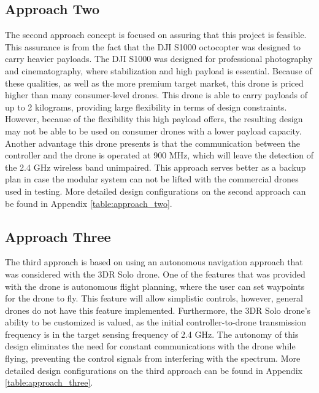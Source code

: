 \subsection{Approach Two}
The second approach concept is focused on assuring that this project is feasible. This assurance is from the fact that the DJI S1000 octocopter was designed to carry heavier payloads. The DJI S1000 was designed for professional photography and cinematography, where stabilization and high payload is essential. Because of these qualities, as well as the more premium target market, this drone is priced higher than many consumer-level drones. This drone is able to carry payloads of up to 2 kilograms, providing large flexibility in terms of design constraints. However, because of the flexibility this high payload offers, the resulting design may not be able to be used on consumer drones with a lower payload capacity. Another advantage this drone presents is that the communication between the controller and the drone is operated at 900 MHz, which will leave the detection of the 2.4 GHz wireless band unimpaired. This approach serves better as a backup plan in case the modular system can not be lifted with the commercial drones used in testing. More detailed design configurations on the second approach can be found in Appendix \ref{table:approach_two}.

\subsection{Approach Three}
The third approach is based on using an autonomous navigation approach that was considered with the 3DR Solo drone. One of the features that was provided with the drone is autonomous flight planning, where the user can set waypoints for the drone to fly. This feature will allow simplistic controls, however, general drones do not have this feature implemented. Furthermore, the 3DR Solo drone’s ability to be customized is valued, as the initial controller-to-drone transmission frequency is in the target sensing frequency of 2.4 GHz. The autonomy of this design eliminates the need for constant communications with the drone while flying, preventing the control signals from interfering with the spectrum. More detailed design configurations on the third approach can be found in Appendix \ref{table:approach_three}.


